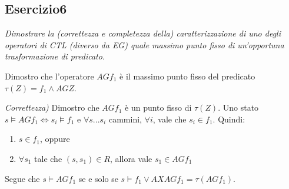 \documentclass[12pt]{article}
\begin{document}
\subsection*{Esercizio6}
\textit{Dimostrare la (correttezza e completezza della) caratterizzazione di uno degli operatori di CTL (diverso da EG) quale massimo punto fisso di un'opportuna trasformazione di predicato.}

Dimostro che l'operatore $AG f_1$ è il massimo punto fisso del predicato $\tau(Z)=f_1 \land AGZ$.

\medskip

\textit{Correttezza)} Dimostro che $AG f_1$ è un punto fisso di $\tau(Z)$.
Uno stato $s \models AG f_1 \Leftrightarrow s_i \models f_1$ e $\forall s...s_i$ cammini, $\forall i$, vale che $s_i \in f_1$. Quindi:
\begin{enumerate}[noitemsep]
\item $s \in f_1$, oppure
\item $\forall s_1$ tale che $(s,s_1) \in R$, allora vale $s_1 \in AG f_1$
\end{enumerate}
Segue che $s \models AG f_1$ se e solo se $s \models f_1 \lor AXAG f_1 = \tau(AG f_1)$.

\medskip
\end{document}
